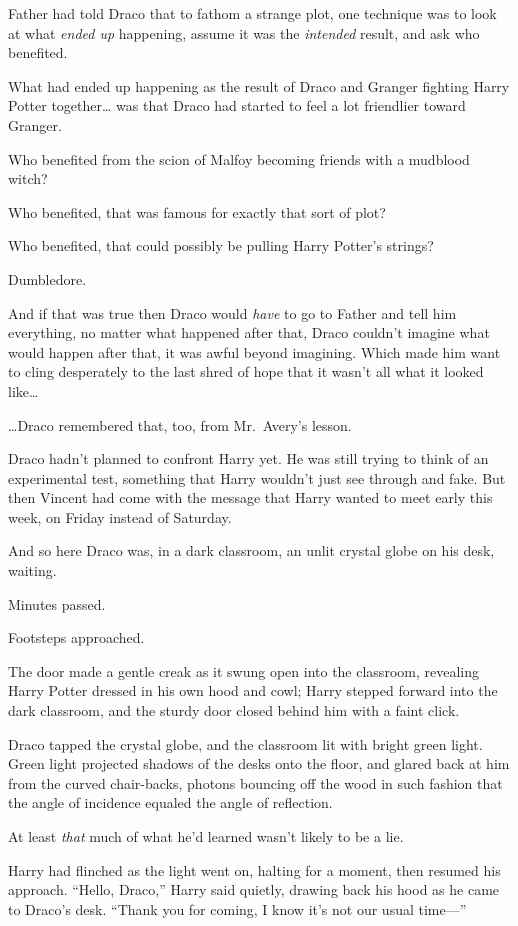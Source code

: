 Father had told Draco that to fathom a strange plot, one technique was
to look at what \emph{ended up} happening, assume it was the
\emph{intended} result, and ask who benefited.

What had ended up happening as the result of Draco and Granger fighting
Harry Potter together\ldots{} was that Draco had started to feel a lot
friendlier toward Granger.

Who benefited from the scion of Malfoy becoming friends with a mudblood
witch?

Who benefited, that was famous for exactly that sort of plot?

Who benefited, that could possibly be pulling Harry Potter's strings?

Dumbledore.

And if that was true then Draco would \emph{have} to go to Father and
tell him everything, no matter what happened after that, Draco couldn't
imagine what would happen after that, it was awful beyond imagining.
Which made him want to cling desperately to the last shred of hope that
it wasn't all what it looked like\ldots{}

\ldots{}Draco remembered that, too, from Mr.~Avery's lesson.

Draco hadn't planned to confront Harry yet. He was still trying to think
of an experimental test, something that Harry wouldn't just see through
and fake. But then Vincent had come with the message that Harry wanted
to meet early this week, on Friday instead of Saturday.

And so here Draco was, in a dark classroom, an unlit crystal globe on
his desk, waiting.

Minutes passed.

Footsteps approached.

The door made a gentle creak as it swung open into the classroom,
revealing Harry Potter dressed in his own hood and cowl; Harry stepped
forward into the dark classroom, and the sturdy door closed behind him
with a faint click.

Draco tapped the crystal globe, and the classroom lit with bright green
light. Green light projected shadows of the desks onto the floor, and
glared back at him from the curved chair-backs, photons bouncing off the
wood in such fashion that the angle of incidence equaled the angle of
reflection.

At least \emph{that} much of what he'd learned wasn't likely to be a
lie.

Harry had flinched as the light went on, halting for a moment, then
resumed his approach. ``Hello, Draco,'' Harry said quietly, drawing back
his hood as he came to Draco's desk. ``Thank you for coming, I know it's
not our usual time---''

